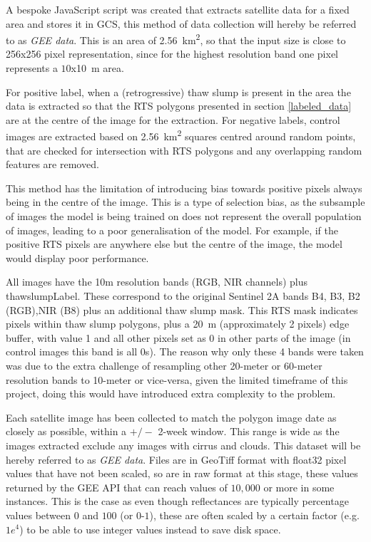 A bespoke JavaScript script was created that extracts satellite data for a fixed area and stores it in \gls{GCS}, this method of data collection will hereby be referred to as \textit{\gls{GEE} data}. This is an area of \SI{2.56}{\kilo\metre\squared}, so that the input size is close to 256x256 pixel representation, since for the highest resolution band one pixel represents a $10$x\SI{10}{\metre} area.

For positive label, when a (retrogressive) thaw slump is present in the area the data is extracted so that the \gls{RTS} polygons presented in section \ref{labeled_data} are at the centre of the image for the extraction.
For negative labels, control images are extracted based on \SI{2.56}{\kilo\metre\squared} squares centred around random points, that are checked for intersection with \gls{RTS} polygons and any overlapping random features are removed. 

This method has the limitation of introducing bias towards positive pixels always being in the centre of the image. This is a type of selection bias, as the subsample of images the model is being trained on does not represent the overall population of images, leading to a poor generalisation of the model. For example, if the positive \gls{RTS} pixels are anywhere else but the centre of the image, the model would display poor performance.

All images have the 10m resolution bands (\gls{RGB}, \gls{NIR} channels) plus thawslumpLabel. These correspond to the original Sentinel 2A bands B4, B3, B2 (\gls{RGB}),\gls{NIR} (B8) plus an additional thaw slump mask. This \gls{RTS} mask indicates pixels within thaw slump polygons, plus a \SI{20}{\metre} (approximately 2 pixels) edge buffer, with value 1 and all other pixels set as 0 in other parts of the image (in control images this band is all 0s). The reason why only these 4 bands were taken was due to the extra challenge of resampling other 20-meter or 60-meter resolution bands to 10-meter or vice-versa, given the limited timeframe of this project, doing this would have introduced extra complexity to the problem.

Each satellite image has been collected to match the polygon image date as closely as possible, within a $+/-$ 2-week window. This range is wide as the images extracted exclude any images with cirrus and clouds. This dataset will be hereby referred to as \textit{\gls{GEE} data}.
Files are in GeoTiff format with float32 pixel values that have not been scaled, so are in raw format at this stage, these values returned by the \gls{GEE} API that can reach values of $10,000$ or more in some instances. This is the case as even though reflectances are typically percentage values between $0$ and $100$ (or $0$-$1$), these are often scaled by a certain factor (e.g. $1 e^4$) to be able to use integer values instead to save disk space. 

